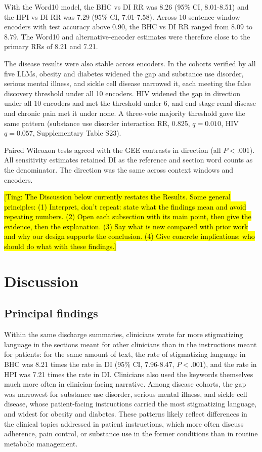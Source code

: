 \documentclass[unnumsec,webpdf,contemporary,large]{oup-authoring-template}
\newcommand{\td}[1]{\sethlcolor{pink}\hl{[Ting: #1]}}
\begin{document}
With the Word10 model, the BHC vs DI RR was 8.26 (95\% CI, 8.01-8.51) and the HPI vs DI RR was 7.29 (95\% CI, 7.01-7.58). Across 10 sentence-window encoders with test accuracy above 0.90, the BHC vs DI RR ranged from 8.09 to 8.79. The Word10 and alternative-encoder estimates were therefore close to the primary RRs of 8.21 and 7.21.

The disease results were also stable across encoders. In the cohorts verified by all five LLMs, obesity and diabetes widened the gap and substance use disorder, serious mental illness, and sickle cell disease narrowed it, each meeting the false discovery threshold under all 10 encoders. HIV widened the gap in direction under all 10 encoders and met the threshold under 6, and end-stage renal disease and chronic pain met it under none. A three-vote majority threshold gave the same pattern (substance use disorder interaction RR, 0.825, $q=0.010$, HIV $q=0.057$, Supplementary Table S23).

Paired Wilcoxon tests agreed with the GEE contrasts in direction (all $P<.001$). All sensitivity estimates retained DI as the reference and section word counts as the denominator. The direction was the same across context windows and encoders.

\FloatBarrier



\td{The Discussion below currently restates the Results. Some general principles:
(1) Interpret, don't repeat: state what the findings mean and avoid repeating numbers.
(2) Open each subsection with its main point, then give the evidence, then the explanation.
(3) Say what is new compared with prior work and why our design supports the conclusion.
(4) Give concrete implications: who should do what with these findings.}
\section{Discussion}

\subsection{Principal findings}

Within the same discharge summaries, clinicians wrote far more stigmatizing language in the sections meant for other clinicians than in the instructions meant for patients: for the same amount of text, the rate of stigmatizing language in BHC was 8.21 times the rate in DI (95\% CI, 7.96-8.47, $P<.001$), and the rate in HPI was 7.21 times the rate in DI. Clinicians also used the keywords themselves much more often in clinician-facing narrative. %
Among disease cohorts, the gap was narrowest for substance use disorder, serious mental illness, and sickle cell disease, whose patient-facing instructions carried the most stigmatizing language, and widest for obesity and diabetes. %
These patterns likely reflect differences in the clinical topics addressed in patient instructions, which more often discuss adherence, pain control, or substance use in the former conditions than in routine metabolic management.
\end{document}
